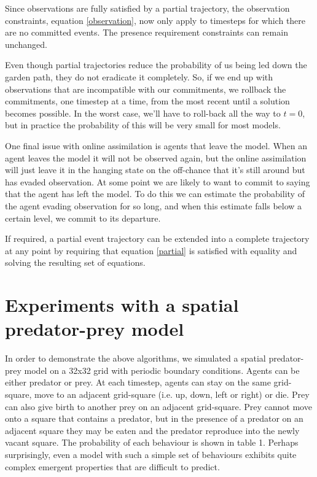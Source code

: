 \documentclass[sigconf]{aamas}
\begin{document}
Since observations are fully satisfied by a partial trajectory, the observation constraints, equation \ref{observation}, now only apply to timesteps for which there are no committed events. The presence requirement constraints can remain unchanged.

Even though partial trajectories reduce the probability of us being led down the garden path, they do not eradicate it completely. So, if we end up with observations that are incompatible with our commitments, we rollback the commitments, one timestep at a time, from the most recent until a solution becomes possible. In the worst case, we'll have to roll-back all the way to $t=0$, but in practice the probability of this will be very small for most models.

One final issue with online assimilation is agents that leave the model. When an agent leaves the model it will not be observed again, but the online assimilation will just leave it in the hanging state on the off-chance that it's still around but has evaded observation. At some point we are likely to want to commit to saying that the agent has left the model. To do this we can estimate the probability of the agent evading observation for so long, and when this estimate falls below a certain level, we commit to its departure.

If required, a partial event trajectory can be extended into a complete trajectory at any point by requiring that equation \ref{partial} is satisfied with equality and solving the resulting set of equations.

\section{Experiments with a spatial predator-prey model}

In order to demonstrate the above algorithms, we simulated a spatial predator-prey model on a 32x32 grid with periodic boundary conditions. Agents can be either predator or prey. At each timestep, agents can stay on the same grid-square, move to an adjacent grid-square (i.e. up, down, left or right) or die. Prey can also give birth to another prey on an adjacent grid-square. Prey cannot move onto a square that contains a predator, but in the presence of a predator on an adjacent square they may be eaten and the predator reproduce into the newly vacant square. The probability of each behaviour is shown in table 1. Perhaps surprisingly, even a model with such a simple set of behaviours exhibits quite complex emergent properties that are difficult to predict.
\end{document}
